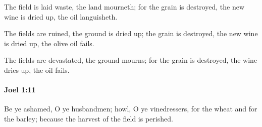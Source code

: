 			\begin{versebox}
					\item[BHS] 
					\item[LXX] 
					\item[ASV] The field is laid waste, the land mourneth; for the grain is destroyed, the new wine is dried up, the oil languisheth.
					\item[NIV] The fields are ruined, the ground is dried up; the grain is destroyed, the new wine is dried up, the olive oil fails.
					\item[NRSV] The fields are devastated, the ground mourns; for the grain is destroyed, the wine dries up, the oil fails.
			\end{versebox}

		\paragraph{Joel 1:11} %
			\label{JOEL-1-11}

			Be ye ashamed, O ye husbandmen; howl, O ye vinedressers, for the wheat and for the barley; because the harvest of the field is perished.

